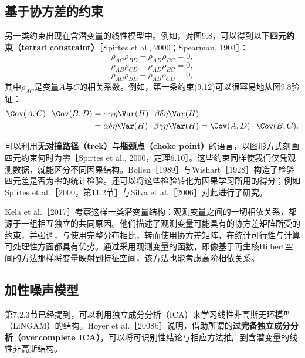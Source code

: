 \subsection{基于协方差的约束}
另一类约束出现在含潜变量的线性模型中。例如，对图9.8，可以得到以下\textbf{四元约束（tetrad constraint）}［Spirtes et al., 2000；Spearman, 1904］：
\begin{equation}
 \rho_{AC}\rho_{BD}-\rho_{AD}\rho_{BC}=0,\tag{9.12}
\end{equation}
\begin{equation}
 \rho_{AB}\rho_{CD}-\rho_{AD}\rho_{BC}=0,\tag{9.13}
\end{equation}
\begin{equation}
 \rho_{AC}\rho_{BD}-\rho_{AB}\rho_{CD}=0,\tag{9.14}
\end{equation}
其中$\rho_{AC}$是变量$A$与$C$的相关系数。例如，第一条约束(9.12)可以很容易地从图9.8验证：
\[
\begin{aligned}
 \Cov(A,C)\cdot\Cov(B,D)
 &=\alpha\gamma\eta\Var(H)\cdot\beta\delta\eta\Var(H)\\
 &=\alpha\delta\eta\Var(H)\cdot\beta\gamma\eta\Var(H)
 =\Cov(A,D)\cdot\Cov(B,C).
\end{aligned}
\]


可以利用\textbf{无对撞路径（trek）}与\textbf{瓶颈点（choke point）}的语言，以图形方式刻画四元约束何时为零［Spirtes et al., 2000，定理6.10］。这些约束同样使我们仅凭观测数据，就能区分不同因果结构。Bollen［1989］与Wishart［1928］构造了检验四元差是否为零的统计检验。还可以将这些检验转化为因果学习所用的得分；例如Spirtes et al.［2000，第11.2节］与Silva et al.［2006］对此进行了研究。

Kela et al.［2017］考察这样一类潜变量结构：观测变量之间的一切相依关系，都源于一组相互独立的共同原因。他们描述了观测变量可能具有的协方差矩阵所受的约束，并强调，与使用完整分布相比，转而使用协方差矩阵，在统计可行性与计算可处理性方面都具有优势。通过采用观测变量的函数，即像基于再生核Hilbert空间的方法那样将变量映射到特征空间，该方法也能考虑高阶相依关系。

\subsection{加性噪声模型}
第7.2.3节已经提到，可以利用独立成分分析（ICA）来学习线性非高斯无环模型（LiNGAM）的结构。Hoyer et al.［2008b］说明，借助所谓的\textbf{过完备独立成分分析（overcomplete ICA）}，可以将可识别性结论与相应方法推广到含潜变量的线性非高斯结构。

